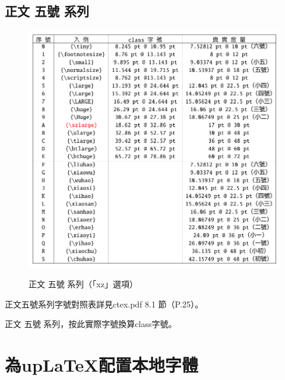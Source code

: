 \subsection{正文 五號 系列}
\begin{figure}[H]
\begin{center}
\caption{正文 五號 系列（「xz」選項）}
{ \includegraphics[scale=0.9]{figures/sz10x.pdf}}
\end{center}

\end{figure}

\vspace*{1mm}
\par 正文五號系列字號對照表詳見ctex.pdf 8.1 節（P.25）。
\par 正文  五號  系列，按此實際字號換算class字號。


\section{為up{\LaTeX}配置本地字體}


